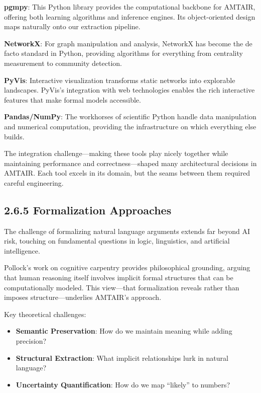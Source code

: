 \documentclass[
  11pt,
  letterpaper,
]{book}
\providecommand{\tightlist}{%
  \setlength{\itemsep}{0pt}\setlength{\parskip}{0pt}}
\begin{document}
\textbf{pgmpy}: This Python library provides the computational backbone
for AMTAIR, offering both learning algorithms and inference engines. Its
object-oriented design maps naturally onto our extraction pipeline.

\textbf{NetworkX}: For graph manipulation and analysis, NetworkX has
become the de facto standard in Python, providing algorithms for
everything from centrality measurement to community detection.

\textbf{PyVis}: Interactive visualization transforms static networks
into explorable landscapes. PyVis's integration with web technologies
enables the rich interactive features that make formal models
accessible.

\textbf{Pandas/NumPy}: The workhorses of scientific Python handle data
manipulation and numerical computation, providing the infrastructure on
which everything else builds.

The integration challenge---making these tools play nicely together
while maintaining performance and correctness---shaped many
architectural decisions in AMTAIR. Each tool excels in its domain, but
the seams between them required careful engineering.

\subsection{2.6.5 Formalization Approaches}\label{sec-formalization}

The challenge of formalizing natural language arguments extends far
beyond AI risk, touching on fundamental questions in logic, linguistics,
and artificial intelligence.

Pollock's work on cognitive carpentry \textcite{pollock1995} provides
philosophical grounding, arguing that human reasoning itself involves
implicit formal structures that can be computationally modeled. This
view---that formalization reveals rather than imposes
structure---underlies AMTAIR's approach.

Key theoretical challenges:

\begin{itemize}
\tightlist
\item
  \textbf{Semantic Preservation}: How do we maintain meaning while
  adding precision?
\item
  \textbf{Structural Extraction}: What implicit relationships lurk in
  natural language?
\item
  \textbf{Uncertainty Quantification}: How do we map ``likely'' to
  numbers?
\end{itemize}
\end{document}
